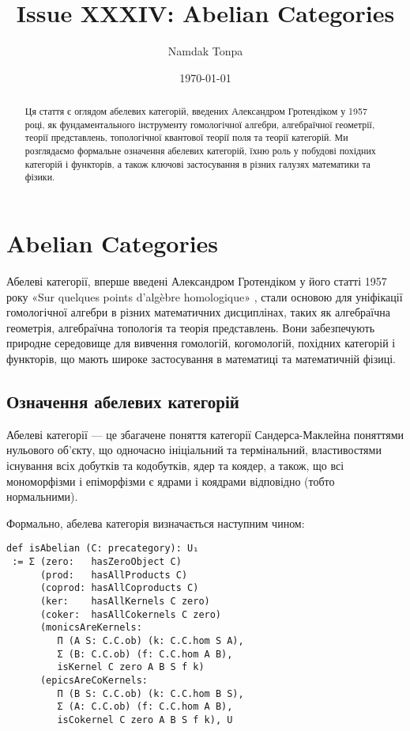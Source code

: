 \documentclass[12pt]{article}
\begin{document}
\title{Issue XXXIV: Abelian Categories}
\author{Namdak Tonpa}
\date{\today}

\maketitle

\begin{abstract}
Ця стаття є оглядом абелевих категорій, введених Александром Гротендіком у 1957 році, як фундаментального інструменту гомологічної алгебри, алгебраїчної геометрії, теорії представлень, топологічної квантової теорії поля та теорії категорій. Ми розглядаємо формальне означення абелевих категорій, їхню роль у побудові похідних категорій і функторів, а також ключові застосування в різних галузях математики та фізики.
\end{abstract}

\section{Abelian Categories}
Абелеві категорії, вперше введені Александром Гротендіком у його статті 1957 року «Sur quelques points d'algèbre homologique» \cite{Grothendieck57}, стали основою для уніфікації гомологічної алгебри в різних математичних дисциплінах, таких як алгебраїчна геометрія, алгебраїчна топологія та теорія представлень. Вони забезпечують природне середовище для вивчення гомологій, когомологій, похідних категорій і функторів, що мають широке застосування в математиці та математичній фізиці.

\subsection{Означення абелевих категорій}
Абелеві категорії — це збагачене поняття категорії Сандерса-Маклейна поняттями нульового об’єкту, що одночасно ініціальний та термінальний, властивостями існування всіх добутків та кодобутків, ядер та коядер, а також, що всі мономорфізми і епіморфізми є ядрами і коядрами відповідно (тобто нормальними).

Формально, абелева категорія визначається наступним чином:

\begin{lstlisting}
def isAbelian (C: precategory): U₁
 := Σ (zero:   hasZeroObject C)
      (prod:   hasAllProducts C)
      (coprod: hasAllCoproducts C)
      (ker:    hasAllKernels C zero)
      (coker:  hasAllCokernels C zero)
      (monicsAreKernels:
         Π (A S: C.C.ob) (k: C.C.hom S A),
         Σ (B: C.C.ob) (f: C.C.hom A B),
         isKernel C zero A B S f k)
      (epicsAreCoKernels:
         Π (B S: C.C.ob) (k: C.C.hom B S),
         Σ (A: C.C.ob) (f: C.C.hom A B),
         isCokernel C zero A B S f k), U
\end{lstlisting}
\end{document}

